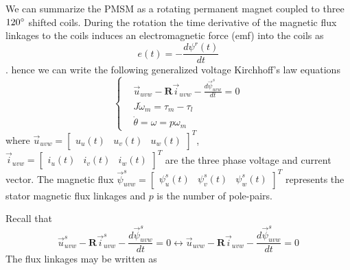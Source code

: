 \documentclass[11pt,a4paper]{article}
\numberwithin{equation}{section}
\theoremstyle{it}
\theoremstyle{definition}
\begin{document}
\begin{onehalfspace}
We can summarize the PMSM as a rotating permanent magnet coupled to three $120\degree$ shifted coils. During the rotation the time derivative of the magnetic flux linkages to the coils induces an electromagnetic force (emf) into the coils as $$e(t) = -\frac{d\psi^r(t)}{dt}$$.
hence we can write the following generalized voltage Kirchhoff's law equations
\begin{equation}\label{threephase_eq1}
	\left\lbrace \begin{aligned}
		& \vec{u}_{uvw}-\mathbf{R}\vec{i}_{uvw}-\frac{d\vec{\psi}^s_{uvw}}{dt} = 0 \\[6pt]
		& J\dot{\omega}_m = \tau_m-\tau_l \\[6pt]
		& \dot{\theta} = \omega = p\omega_m
	\end{aligned} \right. 
\end{equation}
where $\vec{u}_{uvw}=\begin{bmatrix} u_u(t) &  u_v(t) & u_w(t) \end{bmatrix}^T$, $\vec{i}_{uvw}=\begin{bmatrix} i_u(t) &  i_v(t) & i_w(t) \end{bmatrix}^T$ are the three phase voltage and current vector. The magnetic flux $\vec{\psi}^s_{uvw}=\begin{bmatrix} \psi_u^s(t) &  \psi_v^s(t) & \psi_w^s(t) \end{bmatrix}^T$ represents the stator magnetic flux linkages and $p$ is the number of pole-pairs.

Recall that 
\begin{equation*}
	\vec{u}_{uvw}^s-\mathbf{R}\vec{i}_{uvw}^s-\frac{d\vec{\psi}^s_{uvw}}{dt} = 0 \leftrightarrow
	\vec{u}_{uvw}-\mathbf{R}\vec{i}_{uvw}-\frac{d\vec{\psi}^s_{uvw}}{dt} = 0
\end{equation*}
The flux linkages may be written as


\end{onehalfspace}
\end{document}
